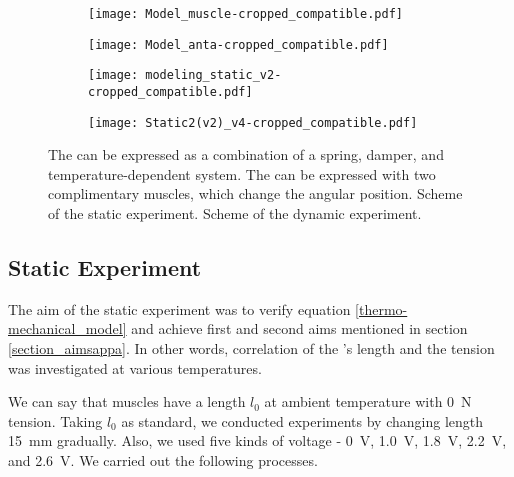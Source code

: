 \begin{figure}[t]
	\centering
	\begin{subfigure}[t]{0.2\textwidth}
		\centering\texttt{[image: Model\_muscle-cropped\_compatible.pdf]}
		\caption{\label{ModelMus}}
	\end{subfigure}
	\begin{subfigure}[t]{0.31\textwidth}
		\centering\texttt{[image: Model\_anta-cropped\_compatible.pdf]}
		\caption{\label{ModelAnt}}
	\end{subfigure}
	\begin{subfigure}[t]{0.22\textwidth}
		\centering\texttt{[image: modeling\_static\_v2-cropped\_compatible.pdf]}
		\caption{\label{static_sch}}
	\end{subfigure}
	\begin{subfigure}[t]{0.22\textwidth}
		\centering\texttt{[image: Static2(v2)\_v4-cropped\_compatible.pdf]} %
		\caption{\label{dynamic_sch}}
	\end{subfigure}
	\caption[Modeling of \scps]{ The \scp can be expressed as a combination of a spring, damper, and temperature-dependent system.  The \anta can be expressed with two complimentary muscles, which change the angular position.  Scheme of the static experiment.  Scheme of the dynamic experiment.}
	\label{model+exp_sch}
\end{figure}

\subsection{Static Experiment}
The aim of the static experiment was to verify equation \eqref{thermo-mechanical_model} and achieve first and second aims mentioned in section \ref{section_aimsappa}. In other words, correlation of the \scpnospace's length and the tension was investigated at various temperatures. 

We can say that muscles have a length $l_{0}$ at ambient temperature with \SI{0}{\newton} tension. Taking $l_{0}$ as standard, we conducted experiments by changing length \SI{15}{\milli\meter} gradually. Also, we used five kinds of voltage - \SI{0}{\volt}, \SI{1.0}{\volt}, \SI{1.8}{\volt}, \SI{2.2}{\volt}, and \SI{2.6}{\volt}. 
We carried out the following processes.

